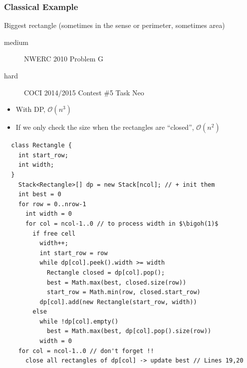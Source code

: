 \documentclass[10pt,svgnames,usenames,table]{beamer} %
\newcommand{\bigoh}{\mathcal{O}}
\begin{document}
\begin{frame}
  \frametitle{Classical Example}
  Biggest rectangle (sometimes in the sense or perimeter, sometimes area)
  \begin{center}
  \end{center}
  \begin{description}
    \item[medium] NWERC 2010 Problem G
    \item[hard] COCI 2014/2015 Contest \#5 Task Neo
  \end{description}
  \framebreak
  \begin{itemize}
    \item With DP, $\bigoh(n^3)$
    \item If we only check the size when the rectangles are ``closed'', $\bigoh(n^2)$
  \end{itemize}
  \begin{lstlisting}
  class Rectangle {
    int start_row;
    int width;
  }
    Stack<Rectangle>[] dp = new Stack[ncol]; // + init them
    int best = 0
    for row = 0..nrow-1
      int width = 0
      for col = ncol-1..0 // to process width in $\bigoh(1)$
        if free cell
          width++;
          int start_row = row
          while dp[col].peek().width >= width
            Rectangle closed = dp[col].pop();
            best = Math.max(best, closed.size(row))
            start_row = Math.min(row, closed.start_row)
          dp[col].add(new Rectangle(start_row, width))
        else
          while !dp[col].empty()
            best = Math.max(best, dp[col].pop().size(row))
          width = 0
    for col = ncol-1..0 // don't forget !!
      close all rectangles of dp[col] -> update best // Lines 19,20
  \end{lstlisting}
\end{frame}
\end{document}

